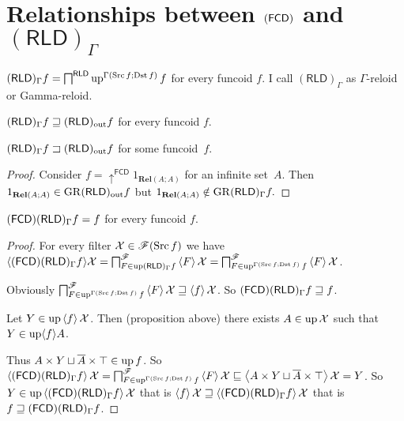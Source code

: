 \section{\texorpdfstring{Relationships between $\protect(\mathsf{FCD})$ and 
$(\mathsf{RLD})_{\Gamma}$}{Relationships between (FCD) and (RLD)\_Gamma}}
\begin{defn}
$(\mathsf{RLD})_{\Gamma}f=\bigsqcap^{\mathsf{RLD}}\operatorname{up}^{\Gamma(\operatorname{Src} f;\operatorname{Dst} f)}f$
for every funcoid $f$. I call $(\mathsf{RLD})_{\Gamma}$ as $\Gamma$-reloid
or Gamma-reloid.\end{defn}
\begin{obvious}
$(\mathsf{RLD})_{\Gamma}f\sqsupseteq(\mathsf{RLD})_{\mathrm{out}} f$ for every funcoid
$f$.\end{obvious}
\begin{example}
$(\mathsf{RLD})_{\Gamma}f\sqsupset(\mathsf{RLD})_{\mathrm{out}} f$ for some funcoid~$f$.\end{example}
\begin{proof}
Consider $f=\uparrow^{\mathsf{FCD}}1_{\mathbf{Rel}(A;A)}$ for an
infinite set~$A$. Then $1_{\mathbf{Rel}(A;A)}\in\operatorname{GR}(\mathsf{RLD})_{\mathrm{out}} f$
but $1_{\mathbf{Rel}(A;A)}\notin\operatorname{GR}(\mathsf{RLD})_{\Gamma}f.$\end{proof}
\begin{lem}
$(\mathsf{FCD})(\mathsf{RLD})_{\Gamma}f=f$ for every funcoid $f$.\end{lem}
\begin{proof}
For every filter $\mathcal{X}\in\mathscr{F}(\operatorname{Src} f)$ we have $\langle(\mathsf{FCD})(\mathsf{RLD})_{\Gamma}f\rangle\mathcal{X}=\bigsqcap_{F\in\operatorname{up}(\mathsf{RLD})_{\Gamma}f}^{\mathscr{F}}\left\langle F\right\rangle\mathcal{X}=\bigsqcap_{F\in\operatorname{up}^{\Gamma(\operatorname{Src} f;\operatorname{Dst} f)}f}^{\mathscr{F}}\left\langle F\right\rangle\mathcal{X}$.

Obviously $\bigsqcap_{F\in\operatorname{up}^{\Gamma(\operatorname{Src} f;\operatorname{Dst} f)}f}^{\mathscr{F}}\left\langle F\right\rangle\mathcal{X}\sqsupseteq\left\langle f\right\rangle\mathcal{X}$.
So $(\mathsf{FCD})(\mathsf{RLD})_{\Gamma}f\sqsupseteq f$.

Let $Y\in\operatorname{up}\left\langle f\right\rangle\mathcal{X}$. Then (proposition above) there
exists $A\in\operatorname{up}\mathcal{X}$ such that $Y\in\operatorname{up}\langle f\rangle A$.

Thus $A\times Y\sqcup\overline{A}\times\top\in\operatorname{up} f$. So $\left\langle (\mathsf{FCD})(\mathsf{RLD})_{\Gamma}f\right\rangle\mathcal{X}=\bigsqcap_{F\in\operatorname{up}^{\Gamma(\operatorname{Src} f;\operatorname{Dst} f)}f}^{\mathscr{F}}\left\langle F\right\rangle\mathcal{X}\sqsubseteq\left\langle A\times Y\sqcup\overline{A}\times\top\right\rangle\mathcal{X}=Y$.
So $Y\in\operatorname{up}\left\langle (\mathsf{FCD})(\mathsf{RLD})_{\Gamma}f\right\rangle\mathcal{X}$ that
is $\left\langle f\right\rangle\mathcal{X}\sqsupseteq\left\langle (\mathsf{FCD})(\mathsf{RLD})_{\Gamma}f\right\rangle\mathcal{X}$
that is $f\sqsupseteq(\mathsf{FCD})(\mathsf{RLD})_{\Gamma}f$.\end{proof}
